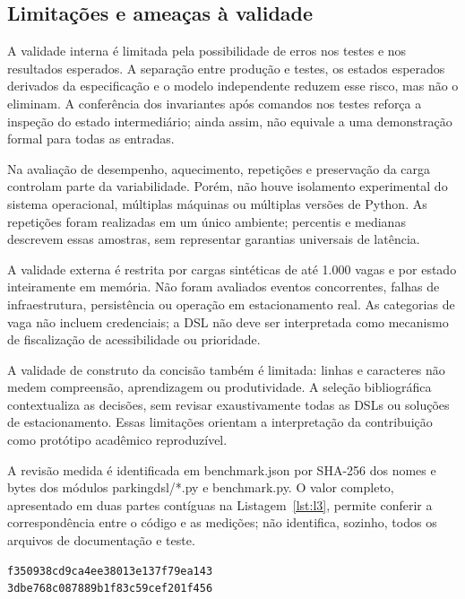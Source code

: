 \documentclass[conference,a4paper]{IEEEtran}
\begin{document}
\subsection{Limitações e ameaças à validade}

A validade interna é limitada pela possibilidade de erros nos testes e nos resultados esperados. A separação entre produção e testes, os estados esperados derivados da especificação e o modelo independente reduzem esse risco, mas não o eliminam. A conferência dos invariantes após comandos nos testes reforça a inspeção do estado intermediário; ainda assim, não equivale a uma demonstração formal para todas as entradas.


Na avaliação de desempenho, aquecimento, repetições e preservação da carga controlam parte da variabilidade. Porém, não houve isolamento experimental do sistema operacional, múltiplas máquinas ou múltiplas versões de Python. As repetições foram realizadas em um único ambiente; percentis e medianas descrevem essas amostras, sem representar garantias universais de latência.


A validade externa é restrita por cargas sintéticas de até 1.000 vagas e por estado inteiramente em memória. Não foram avaliados eventos concorrentes, falhas de infraestrutura, persistência ou operação em estacionamento real. As categorias de vaga não incluem credenciais; a DSL não deve ser interpretada como mecanismo de fiscalização de acessibilidade ou prioridade.


A validade de construto da concisão também é limitada: linhas e caracteres não medem compreensão, aprendizagem ou produtividade. A seleção bibliográfica contextualiza as decisões, sem revisar exaustivamente todas as DSLs ou soluções de estacionamento. Essas limitações orientam a interpretação da contribuição como protótipo acadêmico reproduzível.


A revisão medida é identificada em benchmark.json por SHA-256 dos nomes e bytes dos módulos parkingdsl/*.py e benchmark.py. O valor completo, apresentado em duas partes contíguas na Listagem~\ref{lst:l3}, permite conferir a correspondência entre o código e as medições; não identifica, sozinho, todos os arquivos de documentação e teste.


\begin{lstlisting}[caption={SHA-256 da revisão medida; concatenam-se as duas linhas.},label={lst:l3}]
f350938cd9ca4ee38013e137f79ea143
3dbe768c087889b1f83c59cef201f456
\end{lstlisting}
\end{document}
